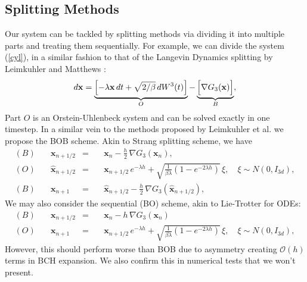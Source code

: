 \documentclass[11pt, twoside]{report}
\renewcommand{\vec}[1]{{\mathbf{#1}}}
\begin{document}
\subsection{Splitting Methods}
Our system can be tackled by splitting methods via dividing it into multiple parts and treating them sequentially. For example, we can divide the system (\ref{cyl}), in a similar fashion to that of the Langevin Dynamics splitting by Leimkuhler and Matthews \cite{leimkuhler2013rational}:
\begin{equation}  
 \begin{aligned}
 d\vec x= \underbrace{\Bigl[-\lambda \vec x \,dt +\sqrt{2/\beta}\, dW^3(t) \Bigr]}_{O} - \underbrace{\Bigl[ \nabla G_{3}(\vec x)\Bigr]}_{B},
  \end{aligned}\label{cyl_split}
\end{equation}
Part $O$ is an Orstein-Uhlenbeck system and can be solved exactly in one timestep. In a similar vein to the methods proposed by Leimkuhler et al. we propose the BOB scheme. Akin to Strang splitting scheme, we have
\begin{equation} 
\begin{aligned} 
(B) \quad &\vec x_{n+1/2}&=&\quad \vec x_{n} - \frac{h}{2}\,\nabla G_{3}(\vec x_n),\\
(O) \quad &\hat{\vec x}_{n+1/2} &=&\quad \vec x_{n+1/2}\, e^{-\lambda h} + \sqrt{\frac{1}{\beta\lambda} \left(1-e^{-2\lambda  h} \right)}\, \xi, \quad \xi \sim N(0,I_{3d}), \\
(B) \quad &\vec x_{n+1}&=&\quad \hat{\vec x}_{n+1/2} - \frac{h}{2}\,\nabla G_{3}(\hat{\vec x}_{n+1/2}),
\label{bob_split}
\end{aligned}
\end{equation}
We may also consider the sequential (BO) scheme, akin to Lie-Trotter for ODEs: 
\begin{equation} 
\begin{aligned} 
(B) \quad &\vec x_{n+1/2}&=& \quad \vec x_{n} - h\,\nabla G_{3}(\vec x_n)\\
(O) \quad &\vec x_{n+1} &=& \quad \vec x_{n+1/2}\, e^{-\lambda h} + \sqrt{\frac{1}{\beta\lambda} \left(1-e^{-2\lambda  h} \right)}\, \xi, \quad \xi \sim N(0,I_{3d}),
\label{seq_split}
\end{aligned}
\end{equation}
However, this should perform worse than BOB due to asymmetry creating $\mathcal{O}(h)$ terms in BCH expansion. We also confirm this in numerical tests that we won't present.

\end{document}
